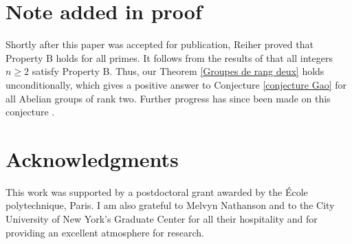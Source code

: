 \documentclass[english,12pt,a4paper,twoside]{smfart}
\theoremstyle{plain}
\theoremstyle{definition}
\theoremstyle{remark}
\begin{document}
\vspace{-0.3cm}
\section*{Note added in proof}
Shortly after this paper was accepted for publication, Reiher \cite{Reiher} proved that Property B holds for all primes. 
It follows from the results of \cite{GaoGeroGrynkie08} that all integers $n \geq 2$ satisfy Property B. 
Thus, our Theorem \ref{Groupes de rang deux} holds unconditionally, which gives a positive answer to Conjecture \ref{conjecture Gao} for all Abelian groups of rank two. 
Further progress has since been made on this conjecture \cite{GuanYuanZeng}.



\vspace{-0.3cm}
\section*{Acknowledgments}
This work was supported by a postdoctoral grant awarded by the \'{E}cole polytechnique, Paris. I am also grateful to Melvyn Nathanson and to the City University of New York's Graduate Center for all their hospitality and for providing an excellent atmosphere for research. 






\end{document}
